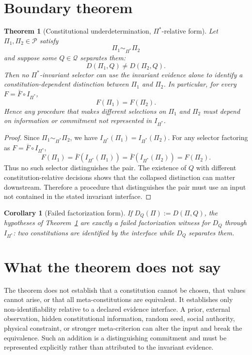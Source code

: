 \documentclass[11pt]{article}
\newtheorem{theorem}{Theorem}
\newtheorem{corollary}{Corollary}
\begin{document}
\section{Boundary theorem}
\begin{theorem}[Constitutional underdetermination, $\Pi^*$-relative form]\label{thm:cu}
Let $\Pi_1,\Pi_2\in\mathcal P$ satisfy
\[
\Pi_1\sim_{\Pi^*}\Pi_2
\]
and suppose some $Q\in\mathcal Q$ separates them:
\[
D(\Pi_1,Q)\neq D(\Pi_2,Q).
\]
Then no $\Pi^*$-invariant selector can use the invariant evidence alone to identify a constitution-dependent distinction between $\Pi_1$ and $\Pi_2$. In particular, for every $F=\bar F\circ I_{\Pi^*}$,
\[
F(\Pi_1)=F(\Pi_2).
\]
Hence any procedure that makes different selections on $\Pi_1$ and $\Pi_2$ must depend on information or commitment not represented in $I_{\Pi^*}$.
\end{theorem}

\begin{proof}
Since $\Pi_1\sim_{\Pi^*}\Pi_2$, we have
$I_{\Pi^*}(\Pi_1)=I_{\Pi^*}(\Pi_2)$. For any selector factoring as $F=\bar F\circ I_{\Pi^*}$,
\[
F(\Pi_1)=\bar F(I_{\Pi^*}(\Pi_1))
=\bar F(I_{\Pi^*}(\Pi_2))=F(\Pi_2).
\]
Thus no such selector distinguishes the pair. The existence of $Q$ with different constitution-relative decisions shows that the collapsed distinction can matter downstream. Therefore a procedure that distinguishes the pair must use an input not contained in the stated invariant interface.\qedhere
\end{proof}

\begin{corollary}[Failed factorization form]
If $D_Q(\Pi):=D(\Pi,Q)$, the hypotheses of Theorem~\ref{thm:cu} are exactly a failed factorization witness for $D_Q$ through $I_{\Pi^*}$: two constitutions are identified by the interface while $D_Q$ separates them.
\end{corollary}

\section{What the theorem does not say}
The theorem does not establish that a constitution cannot be chosen, that values cannot arise, or that all meta-constitutions are equivalent. It establishes only non-identifiability relative to a declared evidence interface. A prior, external observation, hidden constitutional information, random seed, social authority, physical constraint, or stronger meta-criterion can alter the input and break the equivalence. Such an addition is a distinguishing commitment and must be represented explicitly rather than attributed to the invariant evidence.
\end{document}
